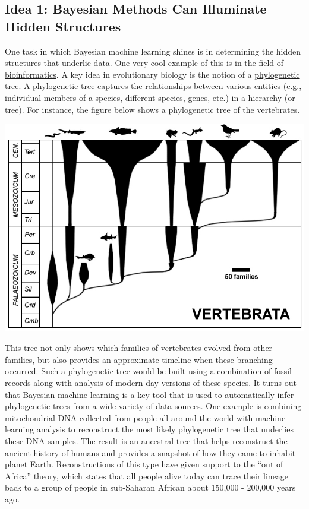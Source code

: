 \documentclass[assignment01_Solutions]{subfiles}
\begin{document}
\subsection*{Idea 1: Bayesian Methods Can Illuminate Hidden Structures}

One task in which Bayesian machine learning shines is in determining the hidden structures that underlie data.  One very cool example of this is in the field of \href{https://en.wikipedia.org/wiki/Bioinformatics}{bioinformatics}.  A key idea in evolutionary biology is the notion of a \href{https://en.wikipedia.org/wiki/Phylogenetic_tree}{phylogenetic tree}.  A phylogenetic tree captures the relationships between various entities (e.g., individual members of a species, different species, genes, etc.) in a hierarchy (or tree).  For instance, the figure below shows a phylogenetic tree of the vertebrates.

\begin{center}
\includegraphics[width=0.8\linewidth]{figures/vertebrates}
\end{center}

This tree not only shows which families of vertebrates evolved from other families, but also provides an approximate timeline when these branching occurred.  Such a phylogenetic tree would be built using a combination of fossil records along with analysis of modern day versions of these species.  It turns out that Bayesian machine learning is a key tool that is used to automatically infer phylogenetic trees from a wide variety of data sources.  One example is combining \href{https://en.wikipedia.org/wiki/Mitochondrial_DNA}{mitochondrial DNA} collected from people all around the world with machine learning analysis to reconstruct the most likely phylogenetic tree that underlies these DNA samples.  The result is an ancestral tree that helps reconstruct the ancient history of humans and provides a snapshot of how they came to inhabit planet Earth.  Reconstructions of this type have given support to the ``out of Africa'' theory, which states that all people alive today can trace their lineage back to a group of people in sub-Saharan African about 150,000 - 200,000 years ago.
\end{document}

